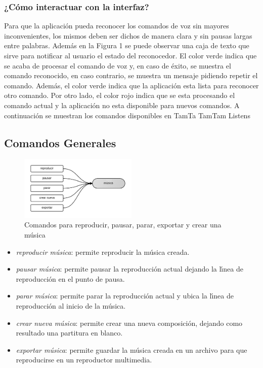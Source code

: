 \subsubsection{¿C\'omo interactuar con la interfaz?}
Para que la aplicaci\'on pueda reconocer los comandos de voz sin mayores inconvenientes, los mismos
deben ser dichos de manera clara y sin pausas largas entre palabras. Adem\'as en la Figura 1 se puede
observar una caja de texto que sirve para notificar al usuario el estado del reconocedor. El color verde
indica que se acaba de procesar el comando  de voz   y,  en caso de  \'exito, se muestra el comando
reconocido, en caso contrario, se muestra un mensaje pidiendo repetir el comando.  Adem\'as, el color
verde indica que la aplicaci\'on esta lista para reconocer otro comando. Por otro lado, el color rojo indica
que se esta procesando el comando actual y la aplicaci\'on no esta disponible para nuevos comandos.
A continuaci\'on se muestran los comandos disponibles en TamTa TamTam Listens

\subsection{Comandos Generales}

\begin{figure}[H] 
\centering
\includegraphics[width=0.5\textwidth]{./graphics/cmd-musica.png}
\caption{Comandos para reproducir, pausar, parar, exportar y crear una m\'usica}
\label{figure:cmd-crear-musica}
\end{figure}

\begin{itemize}
\item \emph{reproducir m\'usica}: permite reproducir la m\'usica creada.
\item \emph{pausar m\'usica}: permite pausar la reproducci\'on actual dejando la l{\'\i}nea de reproducci\'on en el
punto de pausa.
\item \emph{parar m\'usica}: permite parar la reproducci\'on actual y ubica la l{\'\i}nea de reproducci\'on al inicio de
la m\'usica.
\item \emph{crear nueva m\'usica}:  permite crear una nueva composici\'on, dejando como resultado una
partitura en blanco.
\item \emph{exportar m\'usica}: permite guardar la m\'usica creada en un archivo para que reproducirse en un
reproductor multimedia.
\end{itemize}

